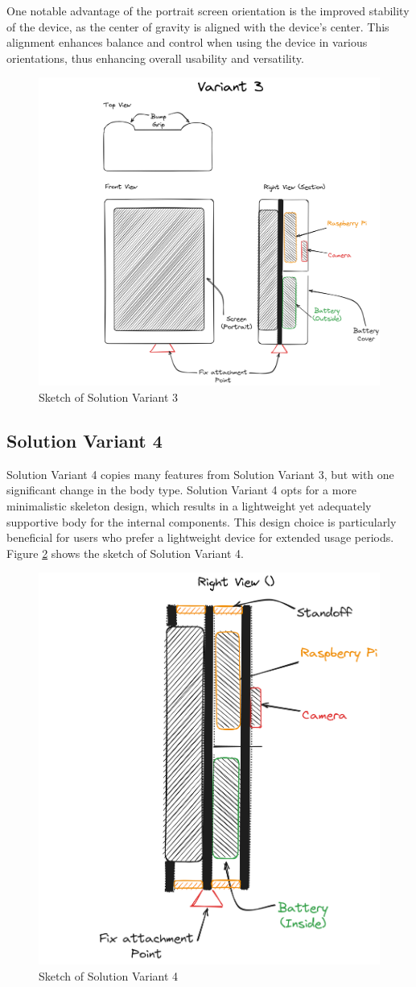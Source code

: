 One notable advantage of the portrait screen orientation is the improved stability of the device, as the center of gravity is aligned with the device's center. This alignment enhances balance and control when using the device in various orientations, thus enhancing overall usability and versatility.

\begin{figure}[H]
    \centering
    \includegraphics[width=0.75\linewidth]{texs/Part1/chapter3/image/v3.png}
    \caption{Sketch of Solution Variant 3}
    \label{fig:sketch-solution-variant-3}
\end{figure}

\subsection{Solution Variant 4}
Solution Variant 4 copies many features from Solution Variant 3, but with one significant change in the body type. Solution Variant 4 opts for a more minimalistic skeleton design, which results in a lightweight yet adequately supportive body for the internal components. This design choice is particularly beneficial for users who prefer a lightweight device for extended usage periods. Figure \ref{fig:sketch-solution-variant-4} shows the sketch of Solution Variant 4.

\begin{figure}[H]
    \centering
    \includegraphics[width=0.5\linewidth]{texs/Part1/chapter3/image/v4.png}
    \caption{Sketch of Solution Variant 4}
    \label{fig:sketch-solution-variant-4}
\end{figure}

